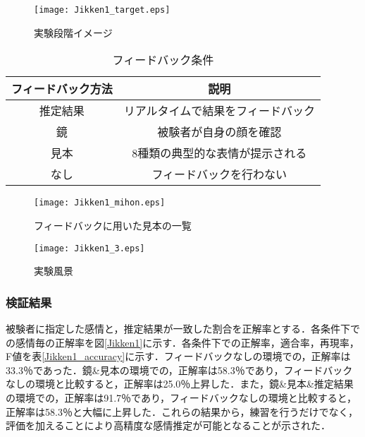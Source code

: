 \documentclass[titlepage]{jarticle}
\begin{document}
\begin{figure}[h]
\begin{center}
\texttt{[image: Jikken1\_target.eps]}
\end{center}
\caption{実験段階イメージ}
\label{Jikken1 target} %
\end{figure}

\begin{table}[h]
\centering
\caption{フィードバック条件}
\begin{tabular}{|c|c|}
    \hline
		フィードバック方法 & 説明 \\
	\hline
	\hline
		推定結果 & リアルタイムで結果をフィードバック \\
	\hline
		鏡 & 被験者が自身の顔を確認 \\
	\hline
		見本 & 8種類の典型的な表情が提示される \\
	\hline
		なし & フィードバックを行わない\\
	\hline
\end{tabular}
\label{Environment List}
\end{table}

\begin{figure}[h]
\begin{center}
\texttt{[image: Jikken1\_mihon.eps]}
\end{center}
\caption{フィードバックに用いた見本の一覧}
\label{Jikken1 mihon} %
\end{figure}

\begin{figure}[h]
\begin{center}
\texttt{[image: Jikken1\_3.eps]}
\end{center}
\caption{実験風景}
\label{Jikken1 3} %
\end{figure}


\afterpage{\clearpage}
\newpage

\subsubsection{検証結果}
被験者に指定した感情と，推定結果が一致した割合を正解率とする．各条件下での感情毎の正解率を図\ref{Jikken1}に示す．各条件下での正解率，適合率，再現率，F値を表\ref{Jikken1_accuracy}に示す．フィードバックなしの環境での，正解率は33.3$％$であった．鏡\&見本の環境での，正解率は58.3$％$であり，フィードバックなしの環境と比較すると，正解率は25.0$％$上昇した．また，鏡\&見本\&推定結果の環境での，正解率は91.7$％$であり，フィードバックなしの環境と比較すると，正解率は58.3$％$と大幅に上昇した．これらの結果から，練習を行うだけでなく，評価を加えることにより高精度な感情推定が可能となることが示された．
\end{document}
